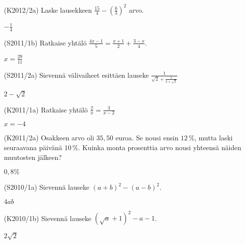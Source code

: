\begin{tehtava}(K2012/2a)  Laske lausekkeen $ \frac{15}{4} - \left( \frac{6}{3} \right)^2 $ arvo.
\begin{vastaus}
				$-\frac{1}{4}$
				\end{vastaus}
\end{tehtava}

\begin{tehtava}(S2011/1b)  Ratkaise yhtälö
                        $ \frac{4x - 1}{5} = \frac{x + 1}{2} + \frac{3 - x}{4}. $
                        \begin{vastaus}
				$x=\frac{29}{11}$
				\end{vastaus}
\end{tehtava}

\begin{tehtava}(S2011/2a)  Sievennä välivaiheet esittäen lauseke
                     $ \frac{1}{\sqrt{2} + \frac{1}{2 + \sqrt{2}}} $
                     \begin{vastaus}
				$2-\sqrt{2}$
				\end{vastaus}
\end{tehtava}


\begin{tehtava}(K2011/1a)  Ratkaise yhtälö
                        $ \frac{2}{x} = \frac{3}{x - 2} $
\begin{vastaus}
				$x=-4$
				\end{vastaus}
\end{tehtava}

\begin{tehtava}(K2011/2a)  Osakkeen arvo oli $35,50$ euroa. Se nousi ensin $12\,\%$,
                        mutta laski seuraavana päivänä $10\,\%$. Kuinka monta prosenttia
                        arvo nousi yhteensä näiden muutosten jälkeen?
                        \begin{vastaus}
				$0,8\%$
				\end{vastaus}
\end{tehtava}


\begin{tehtava}(S2010/1a)  Sievennä lauseke $ (a + b)^2 - (a - b)^2 $.
\begin{vastaus}
				$4ab$
				\end{vastaus}
\end{tehtava}

\begin{tehtava}(K2010/1b)  Sievennä lauseke $ (\sqrt{a} + 1)^2 - a - 1 $.
\begin{vastaus}
				$2\sqrt{2}$
				\end{vastaus}
\end{tehtava}

